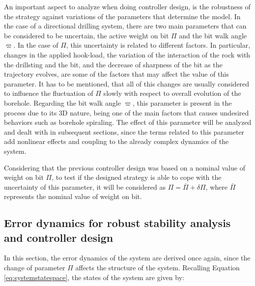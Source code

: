 \documentclass[../main.tex]{subfiles}
\begin{document}

An important aspect to analyze when doing controller design, is the robustness of the strategy against variations of the parameters that determine the model. In the case of a directional drilling system, there are two main parameters that can be considered to be uncertain, the active weight on bit $\Pi$ and the bit walk angle $\varpi$. In the case of $\Pi$, this uncertainty is related to different factors. In particular, changes in the applied hook-load, the variation of the interaction of the rock with the drillsting and the bit, and the decrease of sharpness of the bit as the trajectory evolves, are some of the factors that may affect the value of this parameter. It has to be mentioned, that all of this changes are usually considered to influence the fluctuation of $\Pi$ slowly with respect to overall evolution of the borehole. Regarding the bit walk angle $\varpi$, this parameter is  present in the process due to its 3D nature, being one of the main factors that causes undesired behaviors such as borehole spiraling. The effect of this parameter will be analyzed and dealt with in subsequent sections, since the terms related to this parameter add nonlinear effects and coupling to the already complex dynamics of the system. 

Considering that the previous controller design was based on a nominal value of weight on bit $\Pi$, to test if the designed strategy is able to cope with the uncertainty of this parameter, it will be considered as $\Pi = \bar{\Pi} + \delta\Pi$, where $\bar{\Pi}$ represents the nominal value of weight on bit.

\subsection{Error dynamics for robust stability analysis and controller design}

In this section, the error dynamics of the system are derived once again, since the change of parameter $\Pi$ affects the structure of the system. Recalling Equation \eqref{eq:systemstatespace}, the states of the system are given by:
\end{document}

